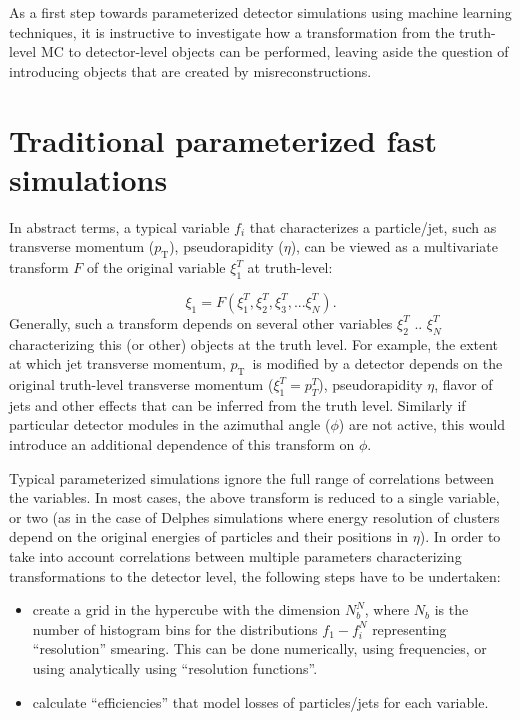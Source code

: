 \documentclass[showpacs,showkeys,preprint,prd,nofootinbib,linenumbers,12pt]{revtex4-1}
\def\pt{\ensuremath{p_{\mathrm{T}}}}
\begin{document}
As a first step towards parameterized detector simulations using machine learning techniques, it is instructive to investigate how a transformation from the truth-level MC to detector-level objects can be performed, leaving aside the question of introducing objects that are created by misreconstructions.

\section{Traditional parameterized fast simulations}

In abstract terms, a typical variable $f_i$ that characterizes a particle/jet, such as transverse momentum (\pt), pseudorapidity ($\eta$), can be viewed as a  multivariate transform $F$ of the original variable $\xi_1^T$ at truth-level:

$$
\xi_1 = F (\xi_1^T, \xi_2^T, \xi_3^T, ...\xi_N^T).
$$
Generally, such a transform  depends on several other variables $\xi_2^T$ ..  $\xi_N^T$ characterizing this (or other) objects at the truth level. For example, the extent at which jet transverse momentum, \pt\ is modified  by a detector depends on the original truth-level transverse momentum ($\xi_1^T=p_T^T$), pseudorapidity $\eta$,  flavor of jets and other effects that can be inferred from the truth level. Similarly if particular detector modules in the azimuthal angle ($\phi$) are not active, this would introduce an additional dependence of this transform on $\phi$.

Typical parameterized simulations ignore the full range of correlations between the variables. In most cases, the above transform is reduced to a single variable, or two (as in the case of Delphes simulations where energy resolution of clusters depend on the original energies of particles and their positions in $\eta$). In order to take into account correlations between  multiple parameters characterizing transformations to the detector level, the following steps have to be undertaken:

\begin{itemize}

\item
  create a grid in the hypercube with the dimension $N_b^N$, where $N_b$ is the number of histogram bins for the distributions $f_1-f_i^N$  representing ``resolution'' smearing. This can be done numerically, using frequencies, or using analytically using ``resolution functions''.

\item
  calculate ``efficiencies'' that model losses of particles/jets for each variable.

\end{itemize}
\end{document}
